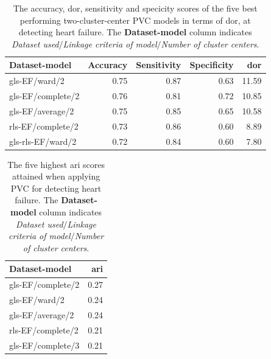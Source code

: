 \begin{table}[htb]
    \centering
    \begin{tabular}{lrrrr}
        \toprule
        Dataset-model    &  Accuracy &  Sensitivity &  Specificity &   \acrshort{dor} \\
        \midrule
        gls-EF/ward/2     &      0.75 &         0.87 &         0.63 & 11.59 \\
        gls-EF/complete/2 &      0.76 &         0.81 &         0.72 & 10.85 \\
        gls-EF/average/2  &      0.75 &         0.85 &         0.65 & 10.58 \\
        rls-EF/complete/2 &      0.73 &         0.86 &         0.60 &  8.89 \\
        gls-rls-EF/ward/2 &      0.72 &         0.84 &         0.60 &  7.80 \\
        \bottomrule
    \end{tabular}
    \caption{The accuracy, \acrshort{dor}, sensitivity and specicity scores of the five best performing two-cluster-center PVC models in terms of \acrshort{dor}, at detecting heart failure.
             The \textbf{Dataset-model} column indicates \textit{Dataset used}$/$\textit{Linkage criteria of model}$/$\textit{Number of cluster centers}.}
    \label{tab:pvc_hf_dor_sens_spec_dist}
\end{table}

\begin{table}[htb]
    \centering
    \begin{tabular}{lr}
        \toprule
        Dataset-model    &  \acrshort{ari} \\
        \midrule
        gls-EF/complete/2 & 0.27 \\
        gls-EF/ward/2     & 0.24 \\
        gls-EF/average/2  & 0.24 \\
        rls-EF/complete/2 & 0.21 \\
        gls-EF/complete/3 & 0.21 \\
        \bottomrule
    \end{tabular}
    \caption{The five highest \acrshort{ari} scores attained when applying PVC for detecting heart failure.
             The \textbf{Dataset-model} column indicates \textit{Dataset used}$/$\textit{Linkage criteria of model}$/$\textit{Number of cluster centers}.}
    \label{tab:pvc_hf_ari}
\end{table}

\newpage

